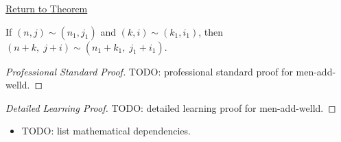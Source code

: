 \newpage
{}
\label{prf:men-add-welld}

\begin{remark*}[Return]
\hyperref[lem:men-add-welld]{Return to Theorem}
\end{remark*}

\begin{lemma*}
If $(n,j) \sim (n_1,j_1)$ and $(k,i) \sim (k_1,i_1)$, then
$(n+k,\; j+i) \sim (n_1+k_1,\; j_1+i_1)$.
\end{lemma*}

\begin{proof}[Professional Standard Proof]
\LRAProofBodyStart
TODO: professional standard proof for men-add-welld.
\end{proof}

\begin{proof}[Detailed Learning Proof]
\LRAProofBodyStart
TODO: detailed learning proof for men-add-welld.
\end{proof}

\begin{remark*}
\end{remark*}

\begin{dependencies}
\begin{itemize}
  \item TODO: list mathematical dependencies.
\end{itemize}
\end{dependencies}

\clearpage
